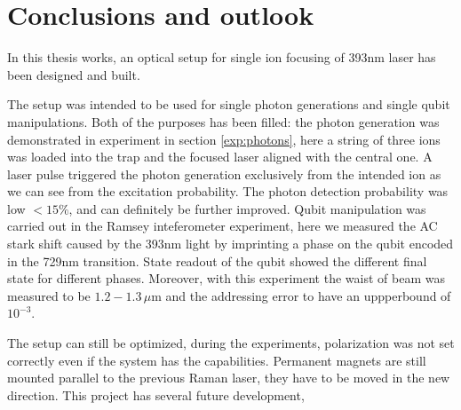 
\chapter{Conclusions and outlook}
In this thesis works, an optical setup for single ion focusing of 393nm laser has been designed and built.

The setup was intended to be used for single photon generations and single qubit manipulations. Both of the purposes has been filled: the photon generation was demonstrated in
experiment in section \ref{exp:photons}, here a string of three ions was loaded into the trap and the focused laser aligned with the central one. A laser pulse triggered the photon generation exclusively from the intended ion as we can see from the excitation probability. The photon detection probability was low $<15\%$, and can definitely be further improved. Qubit manipulation was carried out in the Ramsey inteferometer experiment, here we measured the AC stark shift caused by the 393nm light by imprinting a phase on the qubit encoded in the 729nm transition. State readout of the qubit showed the different final state for different phases. Moreover, with this experiment the waist of beam was measured to be $1.2-1.3\,\mu$m and the addressing error to have an uppperbound of $10^{-3}$.

The setup can still be optimized, during the experiments, polarization was not set correctly even if the system has the capabilities. Permanent magnets are still mounted parallel to the previous Raman laser, they have to be moved in the new direction.
This project has several future development,
